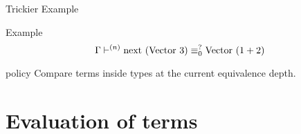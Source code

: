 \documentclass[unicode, aspectratio=169]{beamer}
\begin{document}
    \begin{frame}{Trickier Example}

        \begin{exampleblock}{Example}
            \[\Gamma \vdash^{(n)} \textrm{next } (\textrm{Vector } 3) \equiv^{?}_{0} \textrm{Vector } (1 + 2)\]
        \end{exampleblock}

        \begin{block}{policy}
            Compare terms inside types at the current equivalence depth.
        \end{block}

    \end{frame}
    
    \section{Evaluation of terms}
 
\end{document}
